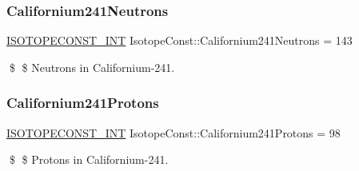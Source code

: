 \subsubsection{\texorpdfstring{Californium241\+Neutrons}{Californium241Neutrons}}
{\footnotesize\ttfamily \mbox{\hyperlink{group___isotope_const-_macros_ga5f18360b3e99483a35c32d789e62621c}{I\+S\+O\+T\+O\+P\+E\+C\+O\+N\+S\+T\+\_\+\+I\+NT}} Isotope\+Const\+::\+Californium241\+Neutrons = 143}

\$ \$ Neutrons in Californium-\/241. \mbox{\label{group___isotope_const-_californium-_cf241_gaff6af556f9d686ceba9e0fe3877ccd7b}} 
\subsubsection{\texorpdfstring{Californium241\+Protons}{Californium241Protons}}
{\footnotesize\ttfamily \mbox{\hyperlink{group___isotope_const-_macros_ga5f18360b3e99483a35c32d789e62621c}{I\+S\+O\+T\+O\+P\+E\+C\+O\+N\+S\+T\+\_\+\+I\+NT}} Isotope\+Const\+::\+Californium241\+Protons = 98}

\$ \$ Protons in Californium-\/241. 